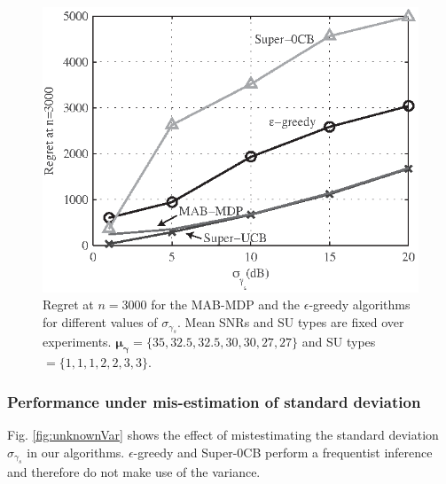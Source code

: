\begin{figure}[!t]
\centering
\includegraphics{VsKnownVar.eps}
\caption{Regret at $n = 3000$ for the MAB-MDP and the $\epsilon$-greedy algorithms for different values of $\sigma_{\gamma_s}$. Mean SNRs and SU types are fixed over experiments. $\boldsymbol{\mu_{\gamma}}=\{35,32.5,32.5,30,30,27,27\}$ and SU types $= \{1,1,1,2,2,3,3\}$.}
\label{fig:VsKnownVar}
\end{figure}

\subsubsection{Performance under mis-estimation of standard deviation}

Fig. \ref{fig:unknownVar} shows the effect of mistestimating the standard deviation $\sigma_{\gamma_s}$ in our algorithms. $\epsilon$-greedy and Super-0CB perform a frequentist inference and therefore do not make use of the variance.

